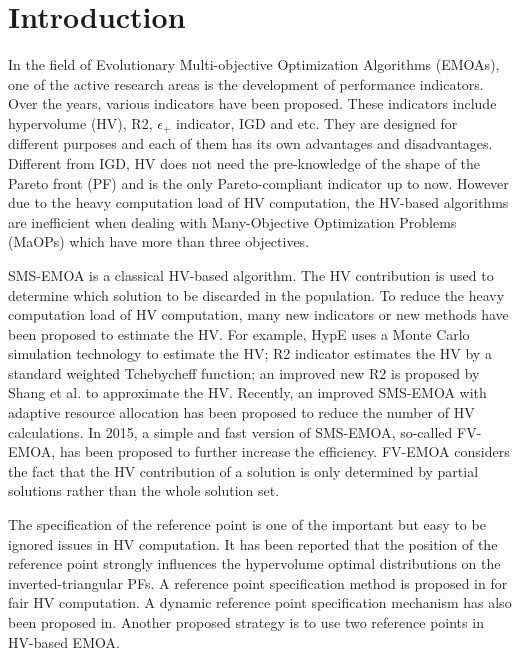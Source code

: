 \documentclass[conference]{IEEEtran}
\begin{document}
\section{Introduction}
In the field of Evolutionary Multi-objective Optimization Algorithms (EMOAs), 
one of the active research areas is the development of performance indicators. 
Over the years, various indicators have been proposed. 
These indicators include hypervolume (HV)\cite{hypervolume}, 
R2\cite{R2}, $\epsilon_+$ indicator\cite{e+}, IGD\cite{IGD} and etc.
They are designed for different purposes and each of them has its own advantages and disadvantages.
Different from IGD, 
HV does not need the pre-knowledge of the shape of the Pareto front (PF) 
and is the only Pareto-compliant indicator up to now\cite{pareto_compliant}. 
However due to the heavy computation load of HV computation\cite{hypervolume:computationLoad}, 
the HV-based algorithms are inefficient when dealing with Many-Objective Optimization Problems (MaOPs) which have more than three objectives. 

SMS-EMOA\cite{smsemoa} is a classical HV-based algorithm. 
The HV contribution is used to determine which solution to be discarded in the population. 
To reduce the heavy computation load of HV computation, 
many new indicators or new methods have been proposed to estimate the HV. 
For example, HypE uses a Monte Carlo simulation technology to estimate the HV\cite{HypE}; 
R2 indicator estimates the HV by a standard weighted Tchebycheff function\cite{R2}; 
an improved new R2 is proposed by Shang et al.\cite{newR2} to approximate the HV. 
Recently, an improved SMS-EMOA with adaptive resource allocation has been proposed to reduce the number of HV calculations\cite{ismsemoa}.  
In 2015, a simple and fast version of SMS-EMOA\cite{smsemoa}, so-called FV-EMOA, has been proposed\cite{FVEMOA}
to further increase the efficiency.
FV-EMOA considers the fact that 
the HV contribution of a solution is only determined by partial solutions rather than the whole solution set\cite{FVEMOA}. 

The specification of the reference point is one of the important but easy to be ignored issues in HV computation.  
It has been reported that the position of the reference point strongly influences the hypervolume optimal distributions 
on the inverted-triangular PFs\cite{hisao:RPhowtoSpecify, hisao:RPspecify, hisao:RPexplanation}. 
A reference point specification method is proposed in \cite{hisao:RPspecify} for fair HV computation.
A dynamic reference point specification mechanism has also been proposed in\cite{hisao:dynamic}.
Another proposed strategy is to use two reference points in HV-based EMOA\cite{hisao:twoRP}. 
\end{document}
